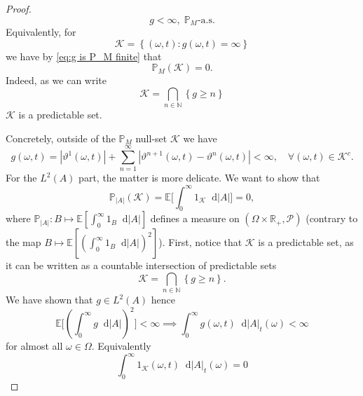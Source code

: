 \documentclass[11pt,a4paper,twoside,openany]{report}
\numberwithin{equation}{section}
\newcommand{\diff}{\mathop{}\!\mathrm{d}}
\theoremstyle{plain} %
\theoremstyle{definition} %
\theoremstyle{remark} %
\begin{document}
\begin{proof}
\begin{equation}
        g<\infty,\;\mathbb{P}_M\text{-a.s.}
    \end{equation}
    Equivalently, for
     \begin{equation*}
        \mathcal{K}=\left\{(\omega,t):g(\omega,t)=\infty\right\}
    \end{equation*}
    we have by \eqref{eq:g is P_M finite} that
    \begin{equation*}
        \mathbb{P}_M(\mathcal{K})=0.
    \end{equation*}
    Indeed, as we can write
    \begin{equation*}
         \mathcal{K}=\bigcap_{n\in\mathbb{N}}\left\{g\geq n\right\}
     \end{equation*}
     \(\mathcal{K}\) is a predictable set.

    
    Concretely, outside of the \(\mathbb{P}_M\) null-set \(\mathcal{K}\) we have 
    \begin{equation*}
        g(\omega,t)=|\vartheta^1(\omega,t)|+\sum_{n=1}^\infty|\vartheta^{n+1}(\omega,t)-\vartheta^n(\omega,t)|<\infty,\quad\forall(\omega,t)\in \mathcal{K}^{c}.
    \end{equation*}
    For the \(L^2(A)\) part, the matter is more delicate. 
    We want to show that 
     \begin{equation*}
         \mathbb{P}_{|A|}(\mathcal{K}) = \mathbb{E}\bigg[\int_0^{\infty}1_\mathcal{K}\diff |A|\bigg]=0,
     \end{equation*}
     where \(\mathbb{P}_{|A|}:B\mapsto \mathbb{E}[\int_0^{\infty}1_B\diff |A|]\) defines a measure on \((\Omega\times\mathbb{R}_+,\mathcal{P})\) (contrary to the map \(B\mapsto \mathbb{E}[\left(\int_0^{\infty}1_B\diff |A|\right)^2]\)). First, notice that \(\mathcal{K}\) is a predictable set, as it can be written as a countable intersection of predictable sets
     \begin{equation*}
         \mathcal{K}=\bigcap_{n\in\mathbb{N}}\left\{g\geq n\right\}.
     \end{equation*}
We have shown that \(g\in L^2(A)\) hence
     \begin{equation*}
          \mathbb{E}\bigg[\left(\int_{0}^{\infty}g\diff |A|\right)^2\bigg]<\infty\implies \int_{0}^{\infty}g(\omega,t)\diff |A|_t(\omega)<\infty
     \end{equation*}
     for almost all \(\omega\in \Omega\).
  Equivalently
  \begin{equation*}
      \int_0^\infty 1_{\mathcal{K}}(\omega,t) \diff |A|_t(\omega)=0
  \end{equation*}

\end{proof}
\end{document}
